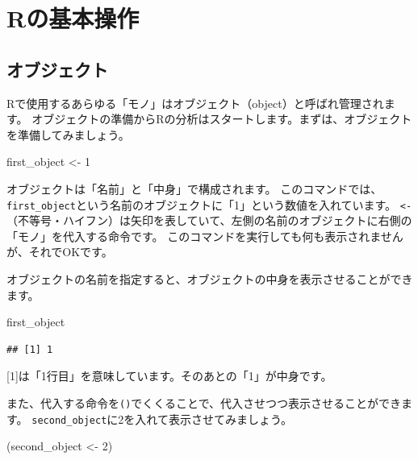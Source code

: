 \documentclass[]{book}
\newenvironment{Shaded}{\begin{snugshade}}{\end{snugshade}}
\newcommand{\DecValTok}[1]{\textcolor[rgb]{0.00,0.00,0.81}{#1}}
\newcommand{\StringTok}[1]{\textcolor[rgb]{0.31,0.60,0.02}{#1}}
\newcommand{\NormalTok}[1]{#1}
\begin{document}
\chapter{Rの基本操作}\label{Rbasics}

\section{オブジェクト}\label{ux30aaux30d6ux30b8ux30a7ux30afux30c8}

Rで使用するあらゆる「モノ」はオブジェクト（object）と呼ばれ管理されます。
オブジェクトの準備からRの分析はスタートします。まずは、オブジェクトを準備してみましょう。

\begin{Shaded}
\begin{Highlighting}[]
\NormalTok{first_object <-}\StringTok{ }\DecValTok{1} 
\end{Highlighting}
\end{Shaded}

オブジェクトは「名前」と「中身」で構成されます。
このコマンドでは、\texttt{first\_object}という名前のオブジェクトに「1」という数値を入れています。
\texttt{\textless{}-}（不等号・ハイフン）は矢印を表していて、左側の名前のオブジェクトに右側の「モノ」を代入する命令です。
このコマンドを実行しても何も表示されませんが、それでOKです。

オブジェクトの名前を指定すると、オブジェクトの中身を表示させることができます。

\begin{Shaded}
\begin{Highlighting}[]
\NormalTok{first_object}
\end{Highlighting}
\end{Shaded}

\begin{verbatim}
## [1] 1
\end{verbatim}

{[}1{]}は「1行目」を意味しています。そのあとの「1」が中身です。

また、代入する命令を\texttt{()}でくくることで、代入させつつ表示させることができます。
\texttt{second\_object}に2を入れて表示させてみましょう。

\begin{Shaded}
\begin{Highlighting}[]
\NormalTok{(second_object <-}\StringTok{ }\DecValTok{2}\NormalTok{)}
\end{Highlighting}
\end{Shaded}
\end{document}
